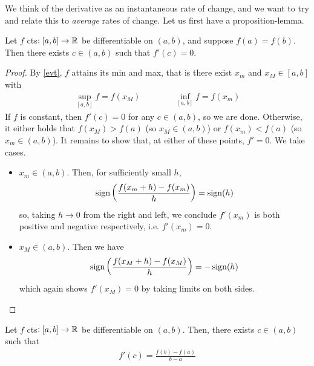 \documentclass{../template/note}
\begin{document}
    We think of the derivative as an instantaneous rate of change, and we want to try and relate this to \emph{average} rates of change.
    Let us first have a proposition-lemma.
    
    \begin{proposition}
        \label{rolle}
        Let \(f\) cts\(: [a, b] \to \mathbb R\) be differentiable on \((a, b)\), and suppose \(f(a) = f(b)\). Then there exists \(c \in (a, b)\) such that \(f'(c) = 0\).
    \end{proposition}
    
    \begin{proof}
        By \cref{evt}, \(f\) attains its min and max, that is there exist \(x_m\) and \(x_M \in [a, b]\) with
        \begin{align*}
            \sup_{[a, b]} f = f(x_M) \qquad \qquad \inf_{[a, b]} f = f(x_m)
        \end{align*}
        If \(f\) is constant, then \(f'(c) = 0\) for any \(c \in (a, b)\), so we are done. Otherwise, it either holds that \(f(x_M) > f(a)\) (so \(x_M \in (a, b)\)) or \(f(x_m) < f(a)\) (so \(x_m \in (a, b)\)). It remains to show that, at either of these points, \(f' = 0\). We take cases.
        \begin{itemize}
            \item \(x_m \in (a,b)\). Then, for sufficiently small \(h\),
            \begin{align*}
                \operatorname{sign}\left(\frac{f(x_m + h)-f(x_m)}h\right) = \operatorname{sign}(h)
            \end{align*}
            so, taking \(h \to 0\) from the right and left, we conclude \(f'(x_m)\) is both positive and negative respectively, i.e. \(f'(x_m) = 0\).
            \item \(x_M \in (a, b)\). Then we have
            \begin{align*}
                \operatorname{sign}\left(\frac{f(x_M + h)-f(x_M)}h\right) = -\operatorname{sign}(h)
            \end{align*}
            which again shows \(f'(x_M) = 0\) by taking limits on both sides.
        \end{itemize}
    \end{proof}
    
    \begin{theorem}
        \label{mvt}
        Let \(f\) cts\(: [a, b] \to \mathbb R\) be differentiable on \((a, b)\). Then, there exists \(c \in (a, b)\) such that
        \begin{align*}
            f'(c) = \frac{f(b)-f(a)}{b-a}
        \end{align*}
    \end{theorem}
\end{document}
